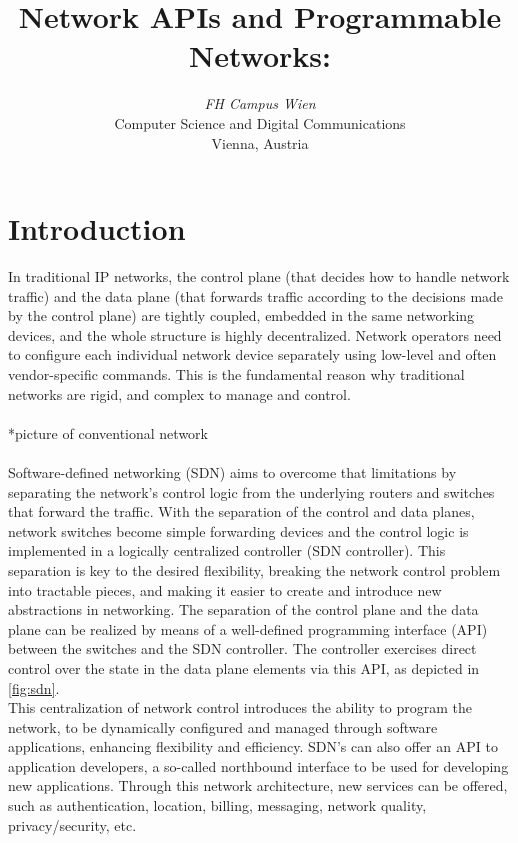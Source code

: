 \documentclass[conference]{IEEEtran}
\begin{document}
\title{Network APIs and Programmable Networks: 
}

\author{
\textit{FH Campus Wien}\\
Computer Science and Digital Communications \\
Vienna, Austria}


\maketitle

\section{Introduction}
In traditional IP networks, the control plane (that decides how to handle network traffic) and the data plane (that forwards traffic according to the decisions made by the control plane) are tightly coupled, embedded in the same networking devices, and the whole structure is highly decentralized. Network operators need to configure each individual network device separately using low-level and often vendor-specific commands. This is the fundamental reason why traditional networks are rigid, and complex to manage and control. \\ \\
*picture of conventional network
\\ \\
Software-defined networking (SDN) aims to overcome that limitations by separating the network's control logic from the underlying routers and switches that forward the traffic. With the separation of the control and data planes, network switches become simple forwarding devices and the control logic is implemented in a logically centralized controller (SDN controller).
This separation is key to the desired flexibility, breaking the network control problem into tractable pieces, and making it easier to create and introduce new abstractions in networking. The separation of the control plane and the data plane can be realized by means of a well-defined programming interface (API) between the switches and the SDN controller. The controller exercises direct control over the state in the data plane elements via this API, as depicted in \ref{fig:sdn}. \\

This centralization of network control introduces the ability to program the network, to be dynamically configured and managed through software applications, enhancing flexibility and efficiency. SDN's can also offer an API to application developers, a so-called northbound interface to be used for developing new applications. Through this network architecture, new services can be offered, such as authentication, location, billing, messaging, network quality, privacy/security, etc.
\end{document}
